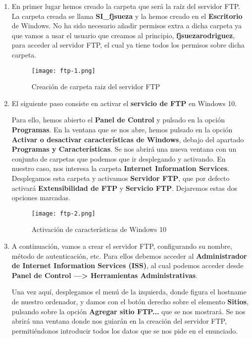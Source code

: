 \begin{enumerate}
    \item En primer lugar hemos creado la carpeta que será la raíz del servidor FTP. La carpeta creada se llama \textbf{SI\_fjsueza} y la hemos creado en el \textbf{Escritorio} de Windows. No ha sido necesario añadir permisos extra a dicha carpeta ya que vamos a usar el usuario que creamos al principio, \textbf{fjsuezarodriguez}, para acceder al servidor FTP, el cual ya tiene todos los permisos sobre dicha carpeta.

    \begin{figure}[H]
        \centering
        \texttt{[image: ftp-1.png]}
        \caption{Creación de carpeta raiz del servidor FTP}
    \end{figure}

    \item El siguiente paso consiste en activar el \textbf{servicio de FTP} en Windows 10.

    Para ello, hemos abierto el \textbf{Panel de Control} y pulsado en la opción \textbf{Programas}. En la ventana que se nos abre, hemos pulsado en la opción \textbf{Activar o desactivar características de Windows}, debajo del apartado \textbf{Programas y Características}. Se nos abrirá una nueva ventana con un conjunto de carpetas que podemos que ir desplegando y activando. En nuestro caso, nos interesa la carpeta \textbf{Internet Information Services}. Desplegamos esta carpeta y activamos \textbf{Servidor FTP}, que por defecto activará \textbf{Extensibilidad de FTP} y \textbf{Servicio FTP}. Dejaremos estas dos opciones marcadas.

    \begin{figure}[H]
        \centering
        \texttt{[image: ftp-2.png]}
        \caption{Activación de características de Windows 10}
    \end{figure}

    \item  A continuación, vamos a crear el servidor FTP, configurando su nombre, método de autenticación, etc. Para ellos debemos acceder al \textbf{Administrador de Internet Information Services (ISS)}, al cual podemos acceder desde \textbf{Panel de Control ---> Herramientas Administrativas}.

    Una vez aquí, desplegamos el menú de la izquierda, donde figura el hostname de nuestro ordenador, y damos con el botón derecho sobre el elemento \textbf{Sitios}, pulsando sobre la opción \textbf{Agregar sitio FTP...} que se nos mostrará. Se nos abrirá una ventana donde nos guiarán en la creación del servidor FTP, permitiéndonos introducir todos los datos que se nos pide en el enunciado.


\end{enumerate}
